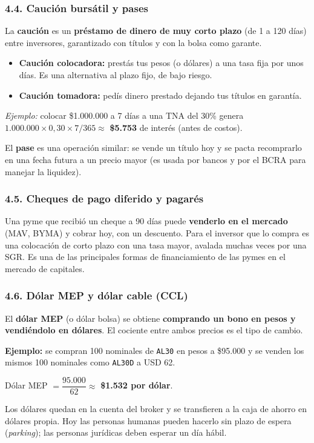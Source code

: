 \subsubsection*{4.4. Caución bursátil y pases}
La \textbf{caución} es un \textbf{préstamo de dinero de muy corto plazo} (de 1 a 120 días)
entre inversores, garantizado con títulos y con la bolsa como garante.
\begin{itemize}
  \item \textbf{Caución colocadora:} prestás tus pesos (o dólares) a una tasa fija por unos días.
        Es una alternativa al plazo fijo, de bajo riesgo.
  \item \textbf{Caución tomadora:} pedís dinero prestado dejando tus títulos en garantía.
\end{itemize}
\textit{Ejemplo:} colocar \$1.000.000 a 7 días a una TNA del 30\% genera
$1.000.000 \times 0{,}30 \times 7/365 \approx$ \textbf{\$5.753} de interés (antes de costos).

El \textbf{pase} es una operación similar: se vende un título hoy y se pacta recomprarlo en una
fecha futura a un precio mayor (es usada por bancos y por el BCRA para manejar la liquidez).

\subsubsection*{4.5. Cheques de pago diferido y pagarés}
Una pyme que recibió un cheque a 90 días puede \textbf{venderlo en el mercado} (MAV, BYMA) y
cobrar hoy, con un descuento. Para el inversor que lo compra es una colocación de corto plazo
con una tasa mayor, avalada muchas veces por una SGR. Es una de las principales formas de
financiamiento de las pymes en el mercado de capitales.

\subsubsection*{4.6. Dólar MEP y dólar cable (CCL)}
El \textbf{dólar MEP} (o dólar bolsa) se obtiene \textbf{comprando un bono en pesos y
vendiéndolo en dólares}. El cociente entre ambos precios es el tipo de cambio.

\begin{recuadro}
\textbf{Ejemplo:} se compran 100 nominales de \texttt{AL30} en pesos a \$95.000 y se venden los
mismos 100 nominales como \texttt{AL30D} a USD 62.

Dólar MEP $= \dfrac{95.000}{62} \approx$ \textbf{\$1.532 por dólar}.

Los dólares quedan en la cuenta del broker y se transfieren a la caja de ahorro en dólares
propia. Hoy las personas humanas pueden hacerlo sin plazo de espera (\textit{parking}); las
personas jurídicas deben esperar un día hábil.
\end{recuadro}

